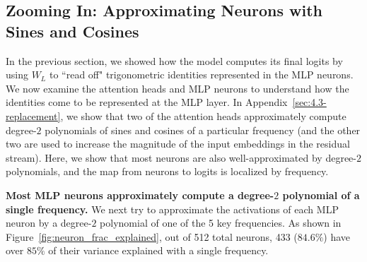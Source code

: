 \documentclass{article} %
\newcommand{\tkpp}{\frac{2k\pi}{P}}
\newcommand{\cosp}[1]{\cos \left ( #1 \right )}
\newcommand{\sinp}[1]{\sin \left ( #1 \right )}
\begin{document}
\subsection{Zooming In: Approximating Neurons with Sines and Cosines}
\label{sec:zoom}

In the previous section, we showed how the model computes its final logits by using $W_L$ to ``read off" trigonometric identities represented in the MLP neurons. We now examine the attention heads and MLP neurons to understand how the identities come to be represented at the MLP layer. In Appendix~\ref{sec:4.3-replacement}, we show that two of the attention heads approximately compute degree-$2$ polynomials of sines and cosines of a particular frequency (and the other two are used to increase the magnitude of the input embeddings in the residual stream). Here, we show that most neurons are also well-approximated by degree-$2$ polynomials, %
and the map from neurons to logits is localized by frequency. %

\textbf{Most MLP neurons approximately compute a degree-$2$ polynomial of a single frequency.} %
We next try to approximate the activations of each MLP neuron by a degree-$2$ polynomial of one of the 5 key frequencies. As shown in Figure~\ref{fig:neuron_frac_explained}, out of 512 total neurons, 433 ($84.6\%$) have over $85\%$ of their variance explained with a single frequency.


\end{document}
